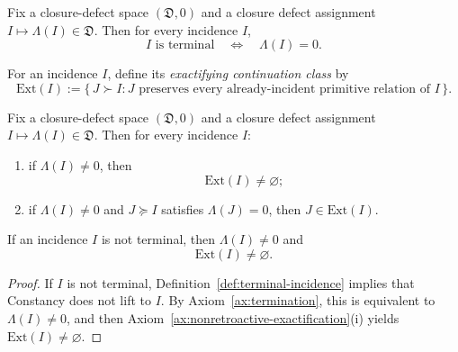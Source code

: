 \begin{axiom}[Termination]
\label{ax:termination}
Fix a closure-defect space \((\mathfrak D,0)\) and a closure defect assignment
\(I\mapsto \Lambda(I)\in\mathfrak D\). Then for every incidence \(I\),
\[
I\text{ is terminal}
\quad\Longleftrightarrow\quad
\Lambda(I)=0.
\]
\end{axiom}

\begin{definition}
\label{def:exactifying-continuation-class}
For an incidence \(I\), define its \emph{exactifying continuation class} by
\[
\mathrm{Ext}(I)
:=
\{\,J\succ I : J \text{ preserves every already-incident primitive relation of } I\,\}.
\]
\end{definition}

\begin{axiom}
\label{ax:nonretroactive-exactification}
Fix a closure-defect space \((\mathfrak D,0)\) and a closure defect assignment
\(I\mapsto \Lambda(I)\in\mathfrak D\). Then for every incidence \(I\):
\begin{enumerate}[label=(\roman*), leftmargin=2em, itemsep=0.2em]
\item if \(\Lambda(I)\neq 0\), then
      \[
      \mathrm{Ext}(I)\neq\varnothing;
      \]
\item if \(\Lambda(I)\neq 0\) and \(J\succeq I\) satisfies \(\Lambda(J)=0\),
      then \(J\in \mathrm{Ext}(I)\).
\end{enumerate}
\end{axiom}

\begin{corollary}
\label{cor:nonterminal-incidences-continue}
If an incidence \(I\) is not terminal, then \(\Lambda(I)\neq 0\) and
\[
\mathrm{Ext}(I)\neq\varnothing.
\]
\end{corollary}

\begin{proof}
If \(I\) is not terminal, Definition~\ref{def:terminal-incidence} implies that
Constancy does not lift to \(I\). By
Axiom~\ref{ax:termination}, this is equivalent to \(\Lambda(I)\neq 0\), and
then Axiom~\ref{ax:nonretroactive-exactification}(i) yields
\(\mathrm{Ext}(I)\neq\varnothing\).
\end{proof}

